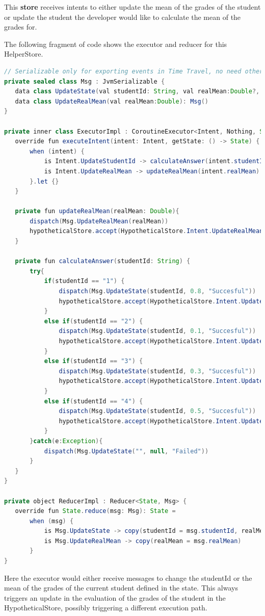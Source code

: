 This \textbf{store} receives intents to either update the mean of the grades of the student or update the student the developer would like to calculate the mean of the grades for.

The following fragment of code shows the executor and reducer for this HelperStore.

\begin{lstlisting}[language=java]
// Serializable only for exporting events in Time Travel, no need otherwise.
private sealed class Msg : JvmSerializable {
   data class UpdateState(val studentId: String, val realMean:Double?, val state:String) : Msg()
   data class UpdateRealMean(val realMean:Double): Msg()
}

private inner class ExecutorImpl : CoroutineExecutor<Intent, Nothing, State, Msg, Nothing>() {
   override fun executeIntent(intent: Intent, getState: () -> State) {
       when (intent) {
           is Intent.UpdateStudentId -> calculateAnswer(intent.studentId)
           is Intent.UpdateRealMean -> updateRealMean(intent.realMean)
       }.let {}
   }

   private fun updateRealMean(realMean: Double){
       dispatch(Msg.UpdateRealMean(realMean))
       hypotheticalStore.accept(HypotheticalStore.Intent.UpdateRealMean(realMean))
   }

   private fun calculateAnswer(studentId: String) {
       try{
           if(studentId == "1") {
               dispatch(Msg.UpdateState(studentId, 0.8, "Succesful"))
               hypotheticalStore.accept(HypotheticalStore.Intent.UpdateRealMean(0.8))
           }
           else if(studentId == "2") {
               dispatch(Msg.UpdateState(studentId, 0.1, "Succesful"))
               hypotheticalStore.accept(HypotheticalStore.Intent.UpdateRealMean(0.1))
           }
           else if(studentId == "3") {
               dispatch(Msg.UpdateState(studentId, 0.3, "Succesful"))
               hypotheticalStore.accept(HypotheticalStore.Intent.UpdateRealMean(0.3))
           }
           else if(studentId == "4") {
               dispatch(Msg.UpdateState(studentId, 0.5, "Succesful"))
               hypotheticalStore.accept(HypotheticalStore.Intent.UpdateRealMean(0.5))
           }
       }catch(e:Exception){
           dispatch(Msg.UpdateState("", null, "Failed"))
       }
   }
}

private object ReducerImpl : Reducer<State, Msg> {
   override fun State.reduce(msg: Msg): State =
       when (msg) {
           is Msg.UpdateState -> copy(studentId = msg.studentId, realMean = msg.realMean, state = msg.state)
           is Msg.UpdateRealMean -> copy(realMean = msg.realMean)
       }
}
\end{lstlisting}

Here the executor would either receive messages to change the studentId or the mean of the grades of the current student defined in the state. This always triggers an update in the evaluation of the grades of the student in the HypotheticalStore, possibly triggering a different execution path.

\endinput

